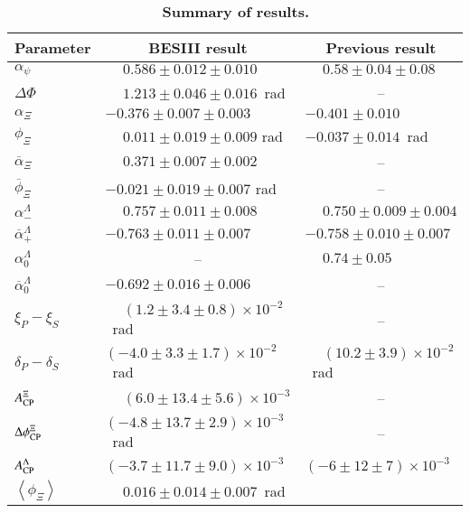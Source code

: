 \begin{table}[hbtp]
\centering
\normalsize
\caption[]{{\bf Summary of results.}}


  \vspace{0.2cm}
  \renewcommand{\arraystretch}{1.3}
\begin{tabular}{lll}
  \hline  \hline
   Parameter  & \multicolumn{1}{c}{BESIII result} & \multicolumn{1}{c}{Previous result} \\
  \hline
  $\alpha_{\psi}$           & $\phantom{-}0.586\pm 0.012 \pm0.010$ &$\phantom{-}0.58\pm0.04 \pm 0.08$ \hfill \cite{Ablikim:2016iym}\\
  $\Delta\Phi$              & $\phantom{-}1.213\pm 0.046 \pm 0.016$~rad &\multicolumn{1}{c}{--} \\

  $\alpha_{\Xi}$           & $-0.376\pm0.007\pm0.003$&$-0.401\pm0.010$\hfill \cite{Zyla:2020zbs}\\
    $\phi_{\Xi}$             & $\phantom{-}0.011\pm0.019\pm0.009$ rad &$-0.037\pm0.014$~rad\hfill \cite{Zyla:2020zbs}\\
  $\overline{\alpha}_{\Xi}$        & $\phantom{-}0.371\pm0.007\pm0.002$ &\multicolumn{1}{c}{--}\\

  $\overline{\phi}_{\Xi}$          & $-0.021\pm0.019\pm0.007$ rad &\multicolumn{1}{c}{--}\\
  $\alpha^{\Lambda}_-$           & $\phantom{-}0.757 \pm 0.011 \pm 0.008$ &$\phantom{-}0.750 \pm 0.009\pm 0.004$\hfill \cite{Ablikim:2018zay}\\
  $\overline{\alpha}^{\Lambda}_+$          & $-0.763 \pm 0.011 \pm 0.007$ &$-0.758\pm 0.010 \pm 0.007$\hfill\cite{Ablikim:2018zay}\\
  $\alpha^{\Lambda}_0$           & \multicolumn{1}{c}{--} & $\phantom{-}0.74\pm0.05$\\
  $\overline{\alpha}^{\Lambda}_0$          & $-0.692 \pm 0.016 \pm 0.006$ & \multicolumn{1}{c}{--}\\
    \hline  \hline
    $\xi_P - \xi_S$      & $\phantom{-}(1.2\pm3.4\pm0.8)\times10^{-2}$~rad & \multicolumn{1}{c}{--} \\
    $\delta_P - \delta_S$  & $(-4.0\pm3.3\pm1.7)\times10^{-2}$~rad & $\phantom{-}(10.2\pm3.9)\times10^{-2}$ ~rad\hfill\cite{Huang:2004jp} \\
  \hline  \hline
  $A_{\rm CP}^{\Xi}$ & $\phantom{-}(6.0\pm13.4\pm5.6)\times10^{-3}$ & \multicolumn{1}{c}{--} \\
  $\Delta\phi_{\rm CP}^{\Xi}$ & $(-4.8\pm13.7\pm2.9)\times10^{-3}$ ~rad & \multicolumn{1}{c}{--} \\
  $A_{\rm CP}^{\Lambda}$ & $(-3.7\pm11.7\pm9.0)\times10^{-3}$  &$(-6\pm12\pm7)\times10^{-3}$ \hfill\cite{Ablikim:2018zay} \\
  \hline  \hline
  $\left<\phi_{\Xi}\right>$            & $\phantom{-}0.016 \pm 0.014 \pm 0.007$~rad & \\
  \hline  \hline
\end{tabular}
  \vspace{0.3cm}
 \label{table:main}
\end{table}
